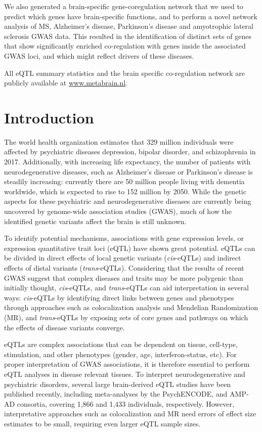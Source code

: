 We also generated a brain-specific gene-coregulation network that we used to predict which genes have brain-specific functions, and to perform a novel network analysis of MS, Alzheimer’s disease, Parkinson’s disease and amyotrophic lateral sclerosis GWAS data. This resulted in the identification of distinct sets of genes that show significantly enriched co-regulation with genes inside the associated GWAS loci, and which might reflect drivers of these diseases. 

All eQTL summary statistics and the brain specific co-regulation network are publicly available at \url{www.metabrain.nl}. 

\section{Introduction}
The world health organization estimates that 329 million individuals were affected by psychiatric diseases depression, bipolar disorder, and schizophrenia in 2017\cite{jamesGlobalRegionalNational2018}. Additionally, with increasing life expectancy, the number of patients with neurodegenerative diseases, such as Alzheimer’s disease or Parkinson’s disease is steadily increasing: currently there are 50 million people living with dementia worldwide, which is expected to rise to 152 million by 2050\cite{WorldAlzheimerReport2018}. While the genetic aspects for these psychiatric and neurodegenerative diseases are currently being uncovered by genome-wide association studies (GWAS), much of how the identified genetic variants affect the brain is still unknown. 

To identify potential mechanisms, associations with gene expression levels, or expression quantitative trait loci (eQTL) have shown great potential. eQTLs can be divided in direct effects of local genetic variants (\emph{cis}-eQTLs) and indirect effects of distal variants (\emph{trans}-eQTLs). Considering that the results of recent GWAS suggest that complex diseases and traits may be more polygenic than initially thought, \emph{cis}-eQTLs, and \emph{trans}-eQTLs can aid interpretation in several ways: \emph{cis}-eQTLs by identifying direct links between genes and phenotypes through approaches such as colocalization analysis and Mendelian Randomization (MR), and \emph{trans}-eQTLs by exposing sets of core genes and pathways on which the effects of disease variants converge.  

eQTLs are complex associations that can be dependent on tissue, cell-type, stimulation, and other phenotypes (gender, age, interferon-status, etc). For proper interpretation of GWAS associations, it is therefore essential to perform eQTL analyses in disease relevant tissues. To interpret neurodegenerative and psychiatric disorders, several large brain-derived eQTL studies have been published recently, including meta-analyses by the PsychENCODE\cite{wangComprehensiveFunctionalGenomic2018}, and AMP-AD\cite{rajIntegrativeTranscriptomeAnalyses2018} consortia, covering 1,866 and 1,433 individuals, respectively. However, interpretative approaches such as colocalization and MR need errors of effect size estimates to be small, requiring even larger eQTL sample sizes. 

